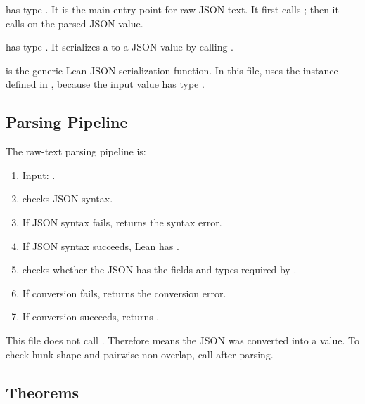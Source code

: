 \begin{definition}[parseDiff]
\code{[parseDiff]} has type . It is the main
entry point for raw JSON text. It first calls ; then it calls
 on the parsed JSON value.
\end{definition}

\begin{definition}[diffAsJson]
\code{[diffAsJson]} has type . It serializes a 
to a JSON value by calling .
\end{definition}

\begin{definition}[toJson]
\code{[toJson]} is the generic Lean JSON serialization function. In this file,
 uses the  instance defined in
, because the input value has type .
\end{definition}

\subsection{Parsing Pipeline}

The raw-text parsing pipeline is:

\begin{enumerate}
  \item Input: .
  \item {} checks JSON syntax.
  \item If JSON syntax fails,  returns the syntax error.
  \item If JSON syntax succeeds, Lean has .
  \item {} checks whether the JSON has the fields and
    types required by .
  \item If conversion fails,  returns the conversion error.
  \item If conversion succeeds,  returns
    .
\end{enumerate}

This file does not call . Therefore
 means the JSON was converted into a
 value. To check hunk shape and pairwise non-overlap, call
 after parsing.

\subsection{Theorems}

